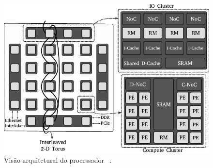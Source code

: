 \begin{figure}[t]
    \centering
    \includegraphics[width=0.6\linewidth]{content/images/arch-mppa-gs.png}
    \caption{Visão arquitetural do processador \mppa~\cite{penna:sbesc19}.}
    \label{fig.arch-mppa}
\end{figure}

\section{\nanvixos}
\label{sec.nanvixos}

